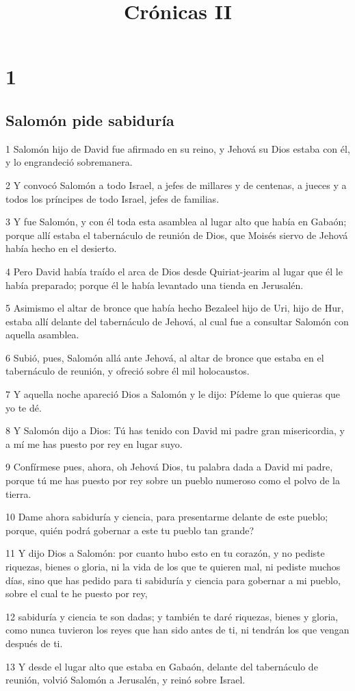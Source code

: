 

\title{Crónicas II}

\chapter{1}

\section*{Salomón pide sabiduría}

\par 1 Salomón hijo de David fue afirmado en su reino, y Jehová su Dios estaba con él, y lo engrandeció sobremanera.
\par 2 Y convocó Salomón a todo Israel, a jefes de millares y de centenas, a jueces y a todos los príncipes de todo Israel, jefes de familias.
\par 3  Y fue Salomón, y con él toda esta asamblea al lugar alto que había en Gabaón; porque allí estaba el tabernáculo de reunión de Dios, que Moisés siervo de Jehová había hecho en el desierto.
\par 4 Pero David había traído el arca de Dios desde Quiriat-jearim al lugar que él le había preparado;  porque él le había levantado una tienda en Jerusalén. 
\par  5 Asimismo el altar de bronce que había hecho Bezaleel hijo de Uri, hijo de Hur, estaba allí delante del tabernáculo de Jehová, al cual fue a consultar Salomón con aquella asamblea. 
\par 6 Subió, pues, Salomón allá ante Jehová, al altar de bronce que estaba en el tabernáculo de reunión, y ofreció sobre él mil holocaustos.
\par 7 Y aquella noche apareció Dios  a Salomón y le dijo: Pídeme lo que quieras que yo te dé.
\par 8 Y Salomón dijo a Dios: Tú has tenido con David mi padre gran misericordia, y a mí me has puesto por rey en  lugar suyo.
\par 9 Confírmese pues, ahora, oh Jehová Dios,  tu palabra dada a David mi padre, porque tú me has puesto por rey sobre un pueblo numeroso como el polvo de la tierra. 
\par 10 Dame ahora sabiduría y ciencia, para presentarme delante de este pueblo; porque, quién podrá gobernar a este tu pueblo tan grande?
\par 11 Y dijo Dios a Salomón: por cuanto hubo esto en tu corazón, y no pediste riquezas, bienes o gloria, ni la vida de los que te quieren mal, ni pediste muchos días, sino que has pedido para ti sabiduría y ciencia para gobernar a mi pueblo, sobre el cual te he puesto por rey,
\par 12 sabiduría y ciencia te son dadas; y también te daré riquezas, bienes y gloria, como nunca tuvieron los reyes que han sido antes de ti, ni tendrán los que vengan después de ti.
\par 13 Y desde el lugar alto que estaba en Gabaón, delante del tabernáculo de reunión, volvió Salomón a Jerusalén, y reinó sobre Israel.

